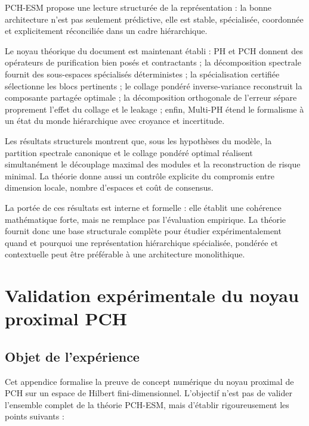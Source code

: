 \documentclass[11pt,a4paper]{article}
\newcommand{\1}{\mathbf 1}
\begin{document}
PCH-ESM propose une lecture structurée de la représentation : la bonne architecture n’est pas seulement prédictive, elle est stable, spécialisée, coordonnée et explicitement réconciliée dans un cadre hiérarchique.

Le noyau théorique du document est maintenant établi : PH et PCH donnent des opérateurs de purification bien posés et contractants ; la décomposition spectrale fournit des sous-espaces spécialisés déterministes ; la spécialisation certifiée sélectionne les blocs pertinents ; le collage pondéré inverse-variance reconstruit la composante partagée optimale ; la décomposition orthogonale de l’erreur sépare proprement l’effet du collage et le leakage ; enfin, Multi-PH étend le formalisme à un état du monde hiérarchique avec croyance et incertitude.

Les résultats structurels montrent que, sous les hypothèses du modèle, la partition spectrale canonique et le collage pondéré optimal réalisent simultanément le découplage maximal des modules et la reconstruction de risque minimal. La théorie donne aussi un contrôle explicite du compromis entre dimension locale, nombre d’espaces et coût de consensus.

La portée de ces résultats est interne et formelle : elle établit une cohérence mathématique forte, mais ne remplace pas l’évaluation empirique. La théorie fournit donc une base structurale complète pour étudier expérimentalement quand et pourquoi une représentation hiérarchique spécialisée, pondérée et contextuelle peut être préférable à une architecture monolithique.




\appendix
\section{Validation expérimentale du noyau proximal PCH}
\label{app:pch-proximal-poc}

\subsection{Objet de l'expérience}

Cet appendice formalise la preuve de concept numérique du noyau proximal de PCH sur un espace de Hilbert fini-dimensionnel.
L'objectif n'est pas de valider l'ensemble complet de la théorie PCH-ESM, mais d'établir rigoureusement les points suivants :
\end{document}
